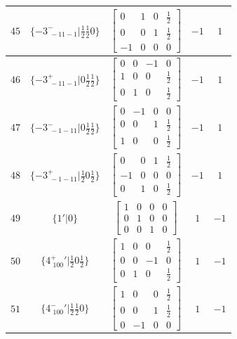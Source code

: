\documentclass[fleqn,8pt]{jsarticle}
\begin{document}
\begin{longtable}{ccccc}
$ 45 $ & $ \{-3^{-}_{\,\,-11-1}|\frac{1}{2} \frac{1}{2} 0\} $ & $ \begin{bmatrix} 0 & 1 & 0 & \frac{1}{2} \\ 0 & 0 & 1 & \frac{1}{2} \\ -1 & 0 & 0 & 0 \end{bmatrix} $ & $ -1 $ & $ 1 $ \\ \hline
$ 46 $ & $ \{-3^{+}_{\,\,-11-1}|0 \frac{1}{2} \frac{1}{2}\} $ & $ \begin{bmatrix} 0 & 0 & -1 & 0 \\ 1 & 0 & 0 & \frac{1}{2} \\ 0 & 1 & 0 & \frac{1}{2} \end{bmatrix} $ & $ -1 $ & $ 1 $ \\ \hline
$ 47 $ & $ \{-3^{-}_{\,\,-1-11}|0 \frac{1}{2} \frac{1}{2}\} $ & $ \begin{bmatrix} 0 & -1 & 0 & 0 \\ 0 & 0 & 1 & \frac{1}{2} \\ 1 & 0 & 0 & \frac{1}{2} \end{bmatrix} $ & $ -1 $ & $ 1 $ \\ \hline
$ 48 $ & $ \{-3^{+}_{\,\,-1-11}|\frac{1}{2} 0 \frac{1}{2}\} $ & $ \begin{bmatrix} 0 & 0 & 1 & \frac{1}{2} \\ -1 & 0 & 0 & 0 \\ 0 & 1 & 0 & \frac{1}{2} \end{bmatrix} $ & $ -1 $ & $ 1 $ \\ \hline
$ 49 $ & $ \{1{}'|0\} $ & $ \begin{bmatrix} 1 & 0 & 0 & 0 \\ 0 & 1 & 0 & 0 \\ 0 & 0 & 1 & 0 \end{bmatrix} $ & $ 1 $ & $ -1 $ \\ \hline
$ 50 $ & $ \{4^{+}_{\,\,100}{}'|\frac{1}{2} 0 \frac{1}{2}\} $ & $ \begin{bmatrix} 1 & 0 & 0 & \frac{1}{2} \\ 0 & 0 & -1 & 0 \\ 0 & 1 & 0 & \frac{1}{2} \end{bmatrix} $ & $ 1 $ & $ -1 $ \\ \hline
$ 51 $ & $ \{4^{-}_{\,\,100}{}'|\frac{1}{2} \frac{1}{2} 0\} $ & $ \begin{bmatrix} 1 & 0 & 0 & \frac{1}{2} \\ 0 & 0 & 1 & \frac{1}{2} \\ 0 & -1 & 0 & 0 \end{bmatrix} $ & $ 1 $ & $ -1 $ \\ \hline

\end{longtable}
\end{document}
